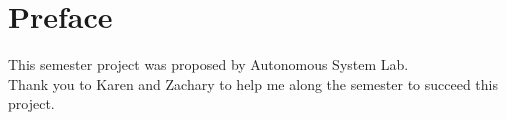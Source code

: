 \chapter*{Preface}

This semester project was proposed by Autonomous System Lab.\\

Thank you to Karen and Zachary to help me along the semester to succeed this project.